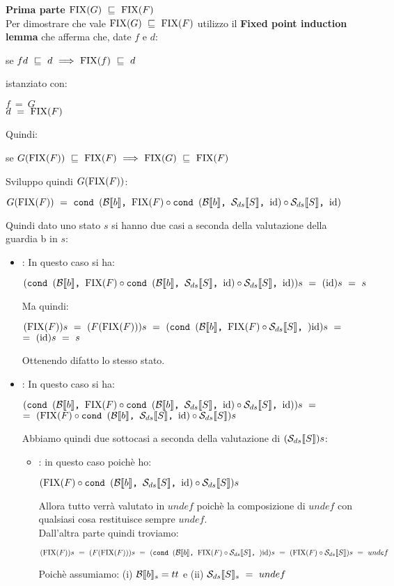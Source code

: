 {	\textbf{Prima parte $\fixp{G}~\mineq~\fixp{F}$}\\
	Per dimostrare che vale $\fixp{G}~\mineq~\fixp{F}$ utilizzo il
	\textbf{Fixed point induction lemma} che afferma che, date $f$ e $d$:
	\begin{center}
	se $fd~\mineq~d~\Longrightarrow~\fixp{f}~\mineq~d$
	\end{center}
	istanziato con:
	\begin{center}
	$f~=~G$ \\
	$d~=~\fixp{F}$
	\end{center}
	Quindi:
	\begin{center}
	se $G(\fixp{F})~\mineq~\fixp{F}~\Longrightarrow~\fixp{G}~\mineq~\fixp{F}$
	\end{center}
	Sviluppo quindi $G(\fixp{F})$:
	\begin{center}
	$G(\fixp{F})~=~\cond{b}{\fixp{F} \circ \cond{b}{\Sds{}}{\idDS} \circ{} 
	\Sds{}}{\idDS}$
	\end{center}
	Quindi dato uno stato $s$ si hanno due casi a seconda della valutazione
	della guardia b in $s$:
	\begin{itemize}
		\item {}: In questo caso si ha:
		\begin{center}
		$(\cond{b}{\fixp{F} \circ \cond{b}{\Sds{}}{\idDS} \circ{} \Sds{}}
		{\idDS})s~=~(\idDS{})s~=~s$
		\end{center}
		Ma quindi:
		\begin{center}
		$(\fixp{F})s~=~(F(\fixp{F}))s~=~(\cond{b}{\fixp{F} \circ{} \Sds{}}
		{\idDS})s~=$\\$=~(\idDS{})s~=~s$
		\end{center}
		Ottenendo difatto lo stesso stato.

		\item {}: In questo caso si ha:
		\begin{center}
		$(\cond{b}{\fixp{F} \circ \cond{b}{\Sds{}}{\idDS} \circ{} \Sds{}}
		{\idDS})s~=$\\$=~(\fixp{F} \circ \cond{b}{\Sds{}}{\idDS} \circ{} 
		\Sds{})s$
		\end{center}
		Abbiamo quindi due sottocasi a seconda della valutazione di $(\Sds{})s$:
		\begin{itemize}
			\item {}: in questo caso poichè ho:
			\begin{center}
			$(\fixp{F} \circ \cond{b}{\Sds{}}{\idDS} \circ{} \Sds{})s$
			\end{center}
			Allora tutto verrà valutato in $undef$ poichè la composizione di 
			$undef$ con qualsiasi cosa restituisce sempre $undef$.\\
			Dall'altra parte quindi troviamo:
			\begin{center}
			$(\fixp{F})s~=~(F(\fixp{F}))s~=~(\cond{b}{\fixp{F} \circ{} \Sds{}}
			{\idDS})s~=~(\fixp{F} \circ{} \Sds{})s~=~undef$
			\end{center}
			Poichè assumiamo: (i) $\evalBbs{b}{s}=tt$ e (ii) $\Sds{}_s~=~undef$


\end{itemize}
\end{itemize}}
